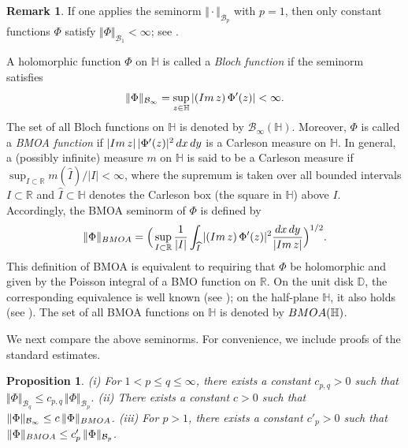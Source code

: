 \documentclass[amstex,12pt,reqno]{amsart}
\newtheorem{proposition}[theorem]{Proposition}
\theoremstyle{definition}
\newtheorem{remark}{Remark}
\begin{document}
\begin{remark}
If one applies the seminorm $\Vert \cdot \Vert_{\mathcal B_p}$ with $p=1$, 
then only constant functions $\Phi$ satisfy $\Vert \Phi\Vert_{{\mathcal B}_1}<\infty$; see \cite[p.~132]{Zhu}.
\end{remark}

A holomorphic function $\Phi$ on $\mathbb H$ is called a {\it Bloch function} if the seminorm satisfies
$$
\Vert \Phi\Vert_{{\mathcal B}_\infty}=\sup_{z \in \mathbb H} |({\rm Im}\,z)\, \Phi'(z)|<\infty.
$$
The set of all Bloch functions on $\mathbb H$ is denoted by $\mathcal B_\infty(\mathbb H)$.
Moreover, $\Phi$ is called a {\it BMOA function} if 
$|{\rm Im}\,z|\,|\Phi'(z)|^2\,dx\,dy$ is a Carleson measure on $\mathbb H$.
In general, a (possibly infinite) measure $m$ on $\mathbb H$ is said to be a Carleson measure if
$\sup_{I \subset \mathbb R} m(\widehat I)/|I|<\infty$,
where the supremum is taken over all bounded intervals $I\subset\mathbb R$ and $\widehat I \subset \mathbb H$ denotes
the Carleson box (the square in $\mathbb H$) above $I$. Accordingly,
the BMOA seminorm of $\Phi$ is defined by
$$
\Vert \Phi \Vert_{\rm BMOA}=\Big(\sup_{I \subset \mathbb R} \frac{1}{|I|}
\int_{\widehat I} |({\rm Im}\,z)\,\Phi'(z)|^2\frac{dx\,dy}{|{\rm Im}\,z|}\Big)^{1/2}.
$$
This definition of BMOA is equivalent to requiring that $\Phi$ be holomorphic and given by the Poisson integral of
a BMO function on $\mathbb R$. On the unit disk $\mathbb D$, the corresponding equivalence is well known
(see \cite[Theorem~6.5]{Gi}); on the half-plane $\mathbb H$, it also holds (see \cite[p.~262]{Ga}).
The set of all BMOA functions on $\mathbb H$ is denoted by ${\rm BMOA}(\mathbb H)$.

We next compare the above seminorms. For convenience, we include proofs of the standard estimates.

\begin{proposition}\label{norm}
{\rm (i)} For $1<p \leq q \leq \infty$, 
there exists a constant $c_{p,q}>0$ such that
$\Vert \Phi\Vert_{{\mathcal B}_q} \leq c_{p,q}\,\Vert \Phi\Vert_{{\mathcal B}_p}$.
{\rm (ii)} There exists a constant $c>0$ such that $\Vert \Phi\Vert_{{\mathcal B}_\infty} \leq c\,\Vert \Phi \Vert_{\rm BMOA}$.
{\rm (iii)} For $p>1$, there exists a constant $c'_p>0$ such that
$\Vert \Phi \Vert_{\rm BMOA} \leq c'_p\,\Vert \Phi \Vert_{{\mathcal B}_p}$.
\end{proposition}
\end{document}
